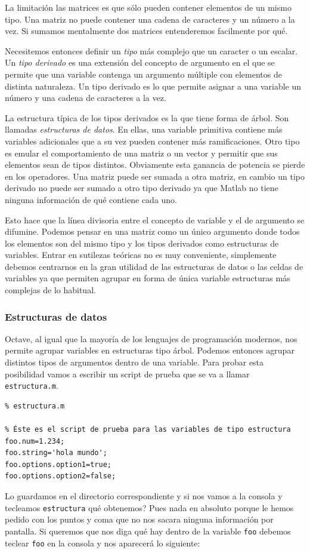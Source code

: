 La limitación las matrices es que sólo pueden contener
elementos de un mismo tipo.  Una matriz no puede contener una cadena
de caracteres y un número a la vez.  Si sumamos mentalmente dos
matrices entenderemos facilmente por qué.

Necesitemos entonces definir un \emph{tipo}
más complejo que un caracter o un escalar.  Un \emph{tipo derivado
}
es una extensión del concepto de argumento en el que se permite que una
variable contenga un argumento múltiple con elementos de distinta
naturaleza.  Un tipo derivado es lo que permite asignar a una variable
un número y una cadena de caracteres a la vez.

La estructura típica de los tipos derivados es la que tiene forma
de árbol.  Son llamadas \emph{estructuras de datos}.  En ellas, una
variable primitiva contiene más variables adicionales que a su vez
pueden contener más ramificaciones. Otro tipo es emular el comportamiento
de una matriz o un vector y permitir que sus elementos sean de tipos
distintos.  Obviamente esta ganancia de potencia se pierde en los
operadores.  Una matriz puede ser sumada a otra matriz, en cambio un
tipo derivado no puede ser sumado a otro tipo derivado ya que Matlab
no tiene ninguna información de qué contiene cada uno.

Esto hace que la línea divisoria entre el concepto de variable y
el de argumento se difumine.  Podemos pensar en una matriz como
un único argumento donde todos los elementos son del mismo tipo
y los tipos derivados como estructuras de variables.  Entrar en 
sutilezas teóricas no es muy conveniente, simplemente debemos
centrarnos en la gran utilidad de las estructuras de datos o las
celdas de variables ya que permiten agrupar en forma de única
variable estructuras más complejas de lo habitual.


\subsubsection{Estructuras de datos}

Octave, al igual que la mayoría de los lenguajes de programación
modernos, nos permite agrupar variables en estructuras tipo árbol.
Podemos entonces agrupar distintos tipos de argumentos dentro de una
variable. Para probar esta posibilidad vamos a escribir un script de
prueba que se va a llamar \texttt{estructura.m}.

\begin{verbatim}
% estructura.m

% Éste es el script de prueba para las variables de tipo estructura
foo.num=1.234;   
foo.string='hola mundo';   
foo.options.option1=true;   
foo.options.option2=false;
\end{verbatim}
Lo guardamos en el directorio correspondiente y si nos vamos a la
consola y tecleamos \texttt{estructura} qué obtenemos? Pues nada en
absoluto porque le hemos pedido con los puntos y coma que no nos
sacara ninguna información por pantalla. Si queremos que nos diga qué
hay dentro de la variable \texttt{foo} debemos teclear \texttt{foo} en
la consola y nos aparecerá lo siguiente:

